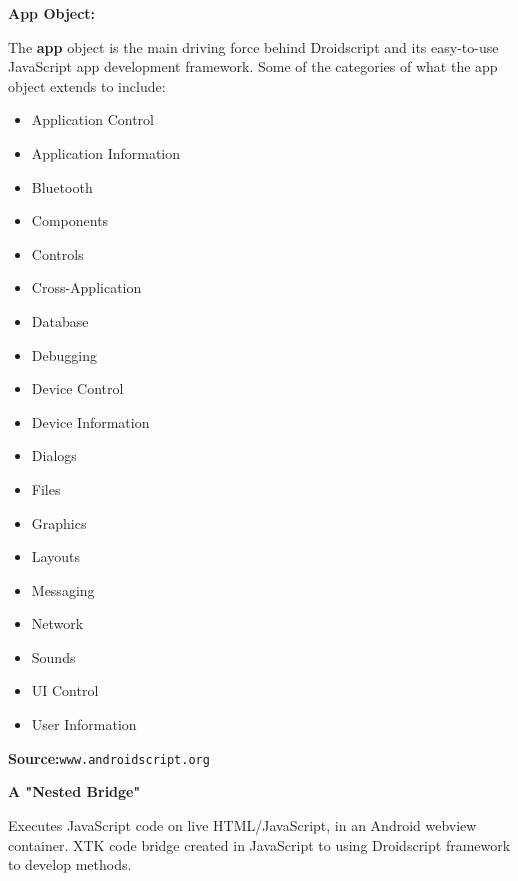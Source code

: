 \documentclass[sigconf]{acmart}
\begin{document}
\textbf{App Object:}

\vspace{0.09 cm}
The \textbf{app} object is the main driving force behind Droidscript and its easy-to-use JavaScript app development framework. Some of the categories of what the app object extends to include:
\begin{itemize}
\item Application Control
\item Application Information
\item Bluetooth
\item Components
\item Controls
\item Cross-Application
\item Database
\item Debugging
\item Device Control
\item Device Information
\item Dialogs
\item Files
\item Graphics
\item Layouts
\item Messaging
\item Network
\item Sounds
\item UI Control
\item User Information
\end{itemize}

\textbf{Source:}\nolinkurl{www.androidscript.org}\newline

\newpage
\textbf{A "Nested Bridge"}
\vspace{0.09 cm}

\vspace{0.09 cm}

\vspace{0.18 cm}
Executes JavaScript code on live HTML/JavaScript, in an Android webview container. XTK code bridge created in JavaScript to using Droidscript framework to develop methods.
\end{document}
